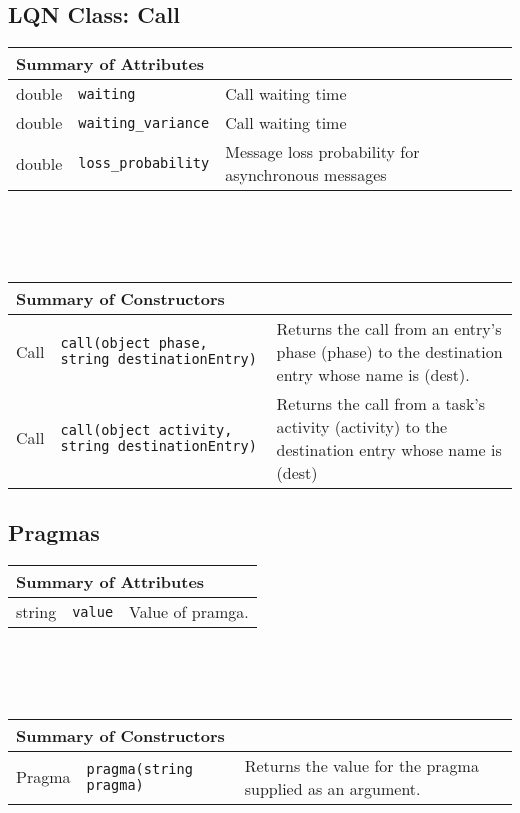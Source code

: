 \subsection{LQN Class: Call}
\begin{tabular}{|p{1.0in}|p{2.3in}||p{2.8in}|}
  \hline
  \multicolumn{3}{|l|}{\textbf{Summary of Attributes}}\\
  \hline
  double & {\tt waiting} & Call waiting time\\
  double & {\tt waiting\_variance} & Call waiting time\\
  double & {\tt loss\_probability} & Message loss probability for asynchronous messages\\
  \hline
\end{tabular}
\\\\\ \\
\begin{tabular}{|p{1.0in}|p{2.3in}||p{2.8in}|}
  \hline
  \multicolumn{3}{|l|}{\textbf{Summary of Constructors}}\\
  \hline
  Call & {\tt call(object phase, string destinationEntry)} & Returns the call from an entry's phase (phase) to the destination entry whose name is (dest).\\
  Call & {\tt call(object activity, string destinationEntry)} & Returns the call from a task's activity (activity) to the destination entry whose name is (dest)\\
  \hline
\end{tabular}

\subsection{Pragmas}
\begin{tabular}{|p{1.0in}|p{2.3in}||p{2.8in}|}
  \hline
  \multicolumn{3}{|l|}{\textbf{Summary of Attributes}}\\
  \hline
  string & {\tt value} & Value of pramga.\\
  \hline
\end{tabular}
\\\\\ \\
\begin{tabular}{|p{1.0in}|p{2.3in}||p{2.8in}|}
  \hline
  \multicolumn{3}{|l|}{\textbf{Summary of Constructors}}\\
  \hline
  Pragma & {\tt pragma(string pragma)} & Returns the value for the pragma supplied as an argument.\\
  \hline
\end{tabular}

